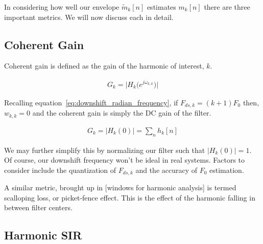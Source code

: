 \documentclass [11pt, proquest,oneside] {ganter_thesis}[2015/03/03]
\begin{document}
In considering how well our envelope $\tilde{m}_k[n]$ estimates $m_k[n]$ there are three important metrics.  We will now discuss each in detail.

\subsection{Coherent Gain}

Coherent gain is defined as the gain of the harmonic of interest, $k$.

\begin{align}
G_k = \Big| H_k\big(e^{j\omega_{k,k}}\big) \Big|
\end{align}

Recalling equation~\ref{eq:downshift_radian_frequency}, if $F_{ds,k} = (k+1)F_0$ then, $w_{k,k} = 0$ and the coherent gain is simply the DC gain of the filter.

\begin{align}
G_k = \Big| H_k(0) \Big| = \sum_n h_k[n]
\end{align}

We may further simplify this by normalizing our filter such that $\Big| H_k(0) \Big| = 1$.  Of course, our downshift frequency won't be ideal in real systems.  Factors to consider include the quantization of $F_{ds,k}$ and the accuracy of $F_0$ estimation.

A similar metric, brought up in [windows for harmonic analysis] is termed scalloping loss, or picket-fence effect.  This is the effect of the harmonic falling in between filter centers.  





\subsection{Harmonic SIR}
\end{document}
